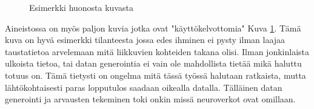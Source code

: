 \begin{figure}[h]
\centering
{}
\caption{Esimerkki huonosta kuvasta}
\label{fig:extreme}
\end{figure}

    
Aineistossa on myös paljon kuvia jotka ovat "käyttökelvottomia" Kuva \ref{fig:extreme}.
Tämä kuva on hyvä esimerkki tilanteesta jossa edes ihminen ei pysty ilman laajaa taustatietoa arvelemaan mitä liikkuvien kohteiden takana olisi.
Ilman jonkinlaista ulkoista tietoa, tai datan generointia ei vain ole mahdollista tietää mikä haluttu totuus on.
Tämä tietysti on ongelma mitä tässä työssä halutaan ratkaista,
mutta lähtökohtaisesti paras lopputulos saadaan oikealla datalla.
Tälläinen datan generointi ja arvausten tekeminen toki onkin missä neuroverkot ovat omillaan.

